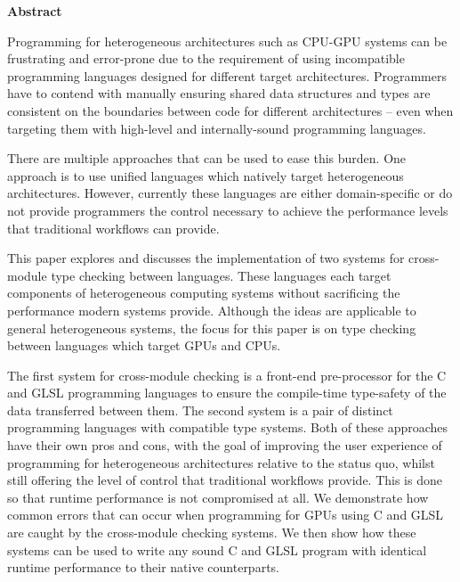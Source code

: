 \newpage
{\Huge \bf Abstract}
\vspace{24pt}






Programming for heterogeneous architectures such as CPU-GPU systems can be
frustrating and error-prone due to the requirement of using incompatible
programming languages designed for different target architectures. Programmers
have to contend with manually ensuring shared data structures and types are
consistent on the boundaries between code for different architectures -- even
when targeting them with high-level and internally-sound programming languages.

There are multiple approaches that can be used to ease this burden. One
approach is to use unified languages which natively target heterogeneous
architectures. However, currently these languages are either domain-specific or
do not provide programmers the control necessary to achieve the performance
levels that traditional workflows can provide.

This paper explores and discusses the implementation of two systems for
cross-module type checking between languages. These languages each target
components of heterogeneous computing systems without sacrificing the
performance modern systems provide. Although the ideas are applicable to
general heterogeneous systems, the focus for this paper is on type checking
between languages which target GPUs and CPUs.

The first system for cross-module checking is a front-end pre-processor for the
C and GLSL programming languages to ensure the compile-time type-safety of the
data transferred between them. The second system is a pair of distinct
programming languages with compatible type systems. Both of these approaches
have their own pros and cons, with the goal of improving the user experience of
programming for heterogeneous architectures relative to the status quo, whilst
still offering the level of control that traditional workflows provide. This is
done so that runtime performance is not compromised at all. We demonstrate how
common errors that can occur when programming for GPUs using C and GLSL are
caught by the cross-module checking systems. We then show how these systems can
be used to write any sound C and GLSL program with identical runtime
performance to their native counterparts.

\newpage
\vspace*{\fill}
